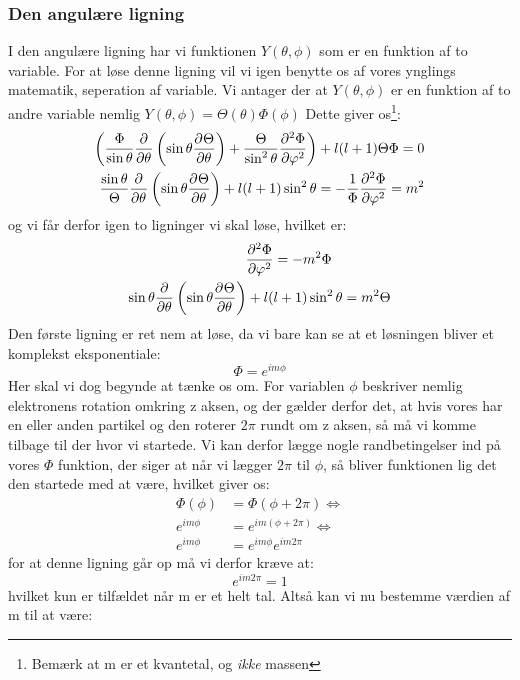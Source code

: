 \documentclass[../../Atom-ogMolekylefysik.tex]{subfiles}
\begin{document}
\subsubsection*{Den angulære ligning}
I den angulære ligning har vi funktionen $Y(\theta,\phi)$ som er en funktion af to variable. For at løse denne ligning vil vi igen benytte os af vores ynglings matematik, seperation af variable. Vi antager der at $Y(\theta,\phi)$ er en funktion af to andre variable nemlig $Y(\theta,\phi)=\Theta(\theta)\Phi(\phi)$ Dette giver os\footnote{Bemærk at m er et kvantetal, og {\em ikke} massen}:
\begin{align*}
    \left(\frac{\Phi}{\sin\theta}\pdif{\theta}{}\left(\sin \theta\pdif{\theta}{\Theta}\right)+\frac{\Theta}{\sin^2\theta}\pdif[2]{\phi}{\Phi}\right)+l(l+1)\Theta\Phi=0\\
\frac{\sin{\theta}}{\Theta}\pdif{\theta}{}\left(\sin{\theta\pdif{\theta}{\Theta}}\right)+l(l+1)\sin^2\theta=-\frac{1}{\Phi}\pdif[2]{\phi}{\Phi}=m^2
\end{align*}
og vi får derfor igen to ligninger vi skal løse, hvilket er:
\begin{align*}
    \pdif[2]{\phi}{\Phi}&=-m^2\Phi\\
    \sin{\theta}\pdif{\theta}{}\left(\sin{\theta\pdif{\theta}{\Theta}}\right)+l(&l+1)\sin^2\theta=m^2\Theta
\end{align*}
Den første ligning er ret nem at løse, da vi bare kan se at et løsningen bliver et komplekst eksponentiale:
\begin{equation}
    \Phi=e^{im\phi}
\end{equation}
Her skal vi dog begynde at tænke os om. For variablen $\phi$ beskriver nemlig elektronens rotation omkring z aksen, og der gælder derfor det, at hvis vores har en eller anden partikel og den roterer $2\pi$ rundt om z aksen, så må vi komme tilbage til der hvor vi startede. Vi kan derfor lægge nogle randbetingelser ind på vores $\Phi$ funktion, der siger at når vi lægger $2\pi$ til $\phi$, så bliver funktionen lig det den startede med at være, hvilket giver os:
\begin{align*}
    \Phi(\phi)&=\Phi(\phi+2\pi)\iff\\
    e^{im\phi}&=e^{im(\phi+2\pi)}\iff\\
    e^{im\phi}&=e^{im\phi}e^{im2\pi}
\end{align*}
for at denne ligning går op må vi derfor kræve at:
\begin{equation*}
    e^{im2\pi}=1
\end{equation*}
hvilket kun er tilfældet når m er et helt tal. Altså kan vi nu bestemme værdien af m til at være:
\end{document}
